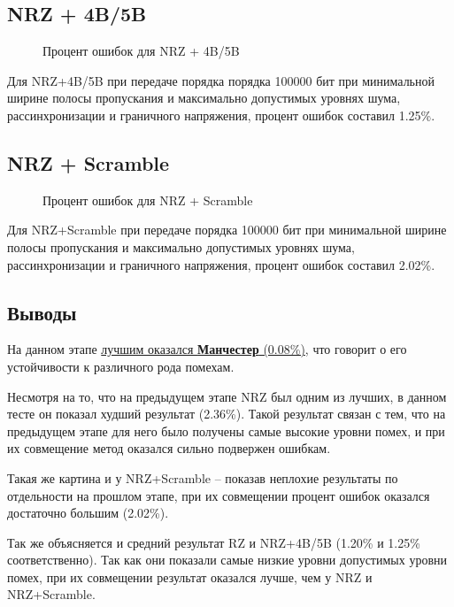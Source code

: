 \subsection{NRZ + 4B/5B}

\vspace{0.4cm}
\begin{wrapfigure}{l}{0.7\textwidth}
	\centering
	\caption{Процент ошибок для NRZ + 4B/5B}
    \vspace{-3.7cm}
\end{wrapfigure}

Для NRZ+4B/5B при передаче порядка порядка 100000 бит при минимальной ширине полосы пропускания и максимально допустимых уровнях шума, рассинхронизации и граничного напряжения, процент ошибок составил 1.25\%.

\vspace{3.7cm}
\subsection{NRZ + Scramble}

\vspace{0.4cm}
\begin{wrapfigure}{r}{0.73\textwidth}
	\centering
	\caption{Процент ошибок для NRZ + Scramble}
    \vspace{-4.5cm}
\end{wrapfigure}

Для NRZ+Scramble при передаче порядка 100000 бит при минимальной ширине полосы пропускания и максимально допустимых уровнях шума, рассинхронизации и граничного напряжения, процент ошибок составил 2.02\%.

\newpage
\subsection{Выводы}

На данном этапе \underline{лучшим оказался \textbf{Манчестер} (0.08\%)}, что говорит о его устойчивости к различного рода помехам.

Несмотря на то, что на предыдущем этапе NRZ был одним из лучших, в данном тесте он показал худший результат (2.36\%). Такой результат связан с тем, что на предыдущем этапе для него было получены самые высокие уровни помех, и при их совмещение метод оказался сильно подвержен ошибкам.

Такая же картина и у NRZ+Scramble – показав неплохие результаты по отдельности на прошлом этапе, при их совмещении процент ошибок оказался достаточно большим (2.02\%).

Так же объясняется и средний результат RZ и NRZ+4B/5B (1.20\% и 1.25\% соответственно). Так как они показали самые низкие уровни допустимых уровни помех, при их совмещении результат оказался лучше, чем у NRZ и NRZ+Scramble.
